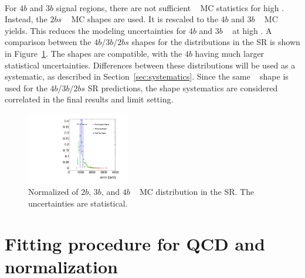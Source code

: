 \paragraph{}
For $4b$ and $3b$ signal regions, there are not sufficient \ttbar~ MC statistics for high \mtwoJ.
Instead, the $2bs$ \ttbar~ MC shapes are used.
It is rescaled to the $4b$ and $3b$ \ttbar~ MC yields.
This reduces the modeling uncertainties for $4b$ and $3b$ \ttbar~ at high \mtwoJ.
A comparison between the $4b/3b/2bs$ shapes for the \mtwoJ distributions in the SR is shown in Figure~\ref{fig:ttshapeComp}.
The shapes are compatible, with the $4b$ having much larger statistical uncertainties.  
Differences between these distributions will be used as a systematic, as described in Section~\ref{sec:systematics}.
Since the same \ttbar~ shape is used for the $4b/3b/2bs$ SR predictions, the shape systematics are considered correlated in the final results and limit setting. 

\begin{figure}[htbp!]
\begin{center}
  \includegraphics[width=0.4\textwidth,angle=-90]{figures/boosted/Other/ttbar_compare_mHH_l.pdf}
\caption{Normalized of $2b$, $3b$, and $4b$ \ttbar~ MC \mtwoJ distribution in the SR. The uncertainties are statistical.}
\label{fig:ttshapeComp}
\end{center}
\end{figure}


\section{Fitting procedure for QCD and \ttbar~ normalization}
\label{sec:ttbarnorm}

